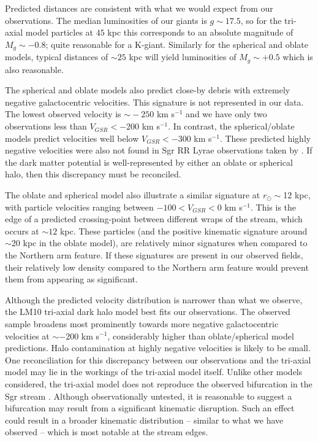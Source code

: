 \documentclass[preprint2]{aastex}
\begin{document}
	Predicted distances are consistent with what we would expect from our observations. The median luminosities of our giants is $g\sim17.5$, so for the tri-axial model particles at $45$ kpc this corresponds to an absolute magnitude of $M_g\sim-0.8$; quite reasonable for a K-giant. Similarly for the spherical and oblate models, typical distances of $\sim25$ kpc will yield luminosities of $M_g\sim+0.5$ which is also reasonable.  
	
	The spherical and oblate models also predict close-by debris with extremely negative galactocentric velocities. This signature is not represented in our data. The lowest observed velocity is $\sim{}-250$ km s$^{-1}$ and we have only two observations less than $V_{GSR} < -200$ km s$^{-1}$. In contrast, the spherical/oblate models predict velocities well below $V_{GSR} < -300$ km s$^{-1}$. These predicted highly negative  velocities were also not found in Sgr RR Lyrae observations taken by \citet{Prior;et-al_2009b}. If the dark matter potential is well-represented by either an oblate or spherical halo, then this discrepancy must be reconciled. 
	
	The oblate and spherical model also illustrate a similar signature at $r_\odot \sim$12 kpc, with particle velocities ranging between $-100 < V_{GSR} < 0$ km s$^{-1}$. This is the edge of a predicted crossing-point between different wraps of the stream, which occurs at $\sim12$ kpc. These particles (and the positive kinematic signature around $\sim$20 kpc in the oblate model), are relatively minor signatures when compared to the Northern arm feature. If these signatures are present in our observed fields, their relatively low density compared to the Northern arm feature would prevent them from appearing as significant. 
	
	Although the predicted velocity distribution is narrower than what we observe, the LM10 tri-axial dark halo model best fits our observations. The observed sample broadens most prominently towards more negative galactocentric velocities at $\sim-200$ km s$^{-1}$, considerably higher than oblate/spherical model predictions. Halo contamination at highly negative velocities is likely to be small. One reconciliation for this discrepancy between our observations and the tri-axial model may lie in the workings of the tri-axial model itself. Unlike other models considered, the tri-axial model does not reproduce the observed bifurcation in the Sgr stream \citep{Belokurov;et-al_2006}. Although observationally untested, it is reasonable to suggest a bifurcation may result from a significant kinematic disruption. Such an effect could result in a broader kinematic distribution \--- similar to what we have observed \--- which is most notable at the stream edges.
	
\end{document}
